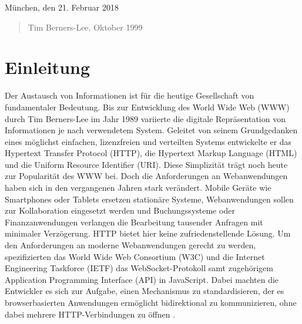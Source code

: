 \documentclass[11pt,a4paper,titlepage]{scrartcl}
\numberwithin{equation}{section}
\begin{document}
\noindent München, den 21. Februar 2018
\newpage
\vspace*{9cm}
\begin{quote}
\medskip
	Tim Berners-Lee, Oktober 1999
\end{quote}

\newpage
 \tableofcontents

\newpage

  \pagestyle{headings}

\section{Einleitung}\label{sec:Einleitung}
Der Austausch von Informationen ist für die heutige Gesellschaft von fundamentaler Bedeutung. Bis zur Entwicklung des World Wide Web (WWW) durch Tim Berners-Lee im Jahr 1989 variierte die digitale Repräsentation von Informationen je nach verwendetem System. Geleitet von seinem Grundgedanken eines möglichst einfachen, lizenzfreien und verteilten Systems entwickelte er das Hypertext Transfer Protocol (HTTP), die Hypertext Markup Language (HTML) und die Uniform Resource Identifier (URI). Diese Simplizität trägt noch heute zur Popularität des WWW bei. Doch die Anforderungen an Webanwendungen haben sich in den vergangenen Jahren stark verändert. Mobile Geräte wie Smartphones oder Tablets ersetzen stationäre Systeme, Webanwendungen sollen zur Kollaboration eingesetzt werden und Buchungssysteme oder Finanzanwendungen verlangen die Bearbeitung tausender Anfragen mit minimaler Verzögerung. HTTP bietet hier keine zufriedenstellende Lösung. Um den Anforderungen an moderne Webanwendungen gerecht zu werden, spezifizierten das World Wide Web Consortium (W3C) und die Internet Engineering Taskforce (IETF) das WebSocket-Protokoll samt zugehörigem Application Programming Interface (API) in JavaScript. Dabei machten die Entwickler es sich zur Aufgabe, einen Mechanismus zu standardisieren, der es browserbasierten Anwendungen ermöglicht bidirektional zu kommunizieren, ohne dabei mehrere HTTP-Verbindungen zu öffnen \autocite{fette_websocket_2011}.\\
\end{document}
